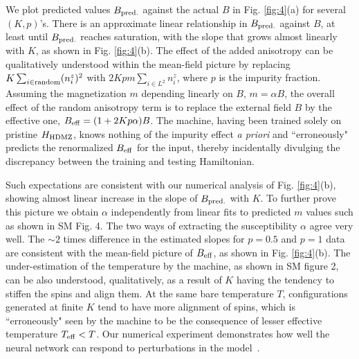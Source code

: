 \documentclass[reprint,amsmath,amssymb,aps,showpacs,superscriptaddress,prl]{revtex4-1}
\begin{document}
We plot predicted values $B_{\rm pred.}$ against the actual $B$ in Fig. \ref{fig:4}(a) for several $(K,p)$'s. There is an approximate linear relationship in $B_{\rm pred.}$ against $B$, at least until $B_{\rm pred.}$ reaches saturation, with the slope that grows almost linearly with $K$, as shown in Fig. \ref{fig:4}(b). The effect of the added anisotropy can be qualitatively understood within the mean-field picture by replacing $K  \sum_{i \in {\rm random}}  (n^z_i )^2$ with $2K p m \sum_{i \in L^2} n^z_i$, where $p$ is the impurity fraction. Assuming the magnetization $m$ depending linearly on $B$, $m = \alpha B$, the overall effect of the random anisotropy term is to replace the external field $B$ by the effective one, $B_{\rm eff} = (1+ 2K p\alpha ) B$. The machine, having been trained solely on pristine $H_{\rm HDMZ}$, knows nothing of the impurity effect {\it a priori} and ``erroneously" predicts the renormalized $B_{\rm eff}$ for the input, thereby incidentally divulging the discrepancy between the training and testing Hamiltonian.

Such expectations are consistent with our numerical analysis of Fig. \ref{fig:4}(b), showing almost linear increase in the slope of $B_{\rm pred.}$ with $K$. To further prove this picture we obtain $\alpha$ independently from linear fits to predicted $m$ values such as shown in SM Fig. 4. The two ways of extracting the susceptibility $\alpha$ agree very well. The $\sim 2$ times difference in the estimated slopes for $p=0.5$ and $p=1$ data are consistent with the mean-field picture of $B_{\rm eff}$, as shown in Fig. \ref{fig:4}(b). The under-estimation of the temperature by the machine, as shown in SM figure 2, can be also understood, qualitatively, as a result of $K$ having the tendency to stiffen the spins and align them. At the same bare temperature $T$, configurations generated at finite $K$ tend to have more alignment of spins, which is ``erroneously" seen by the machine to be the consequence of lesser effective temperature $T_{\rm eff} < T$. Our numerical experiment demonstrates how well the neural network can respond to perturbations in the model~\cite{zhai18b}.
\end{document}

